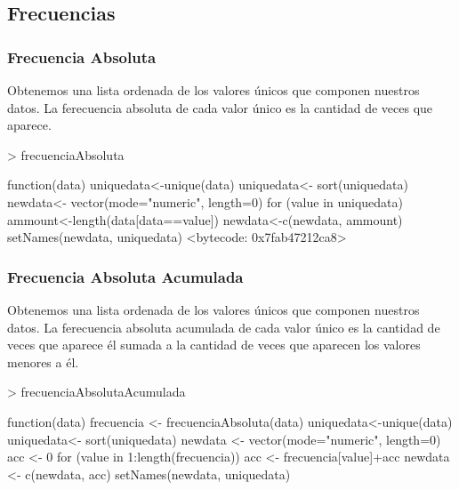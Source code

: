 \documentclass [a4paper] {article}
\begin{document}
\subsection{Frecuencias}
\subsubsection{Frecuencia Absoluta}
Obtenemos una lista ordenada de los valores únicos que componen nuestros datos.
La ferecuencia absoluta de cada valor único es la cantidad de veces que aparece.
\begin{Schunk}
\begin{Sinput}
> frecuenciaAbsoluta
\end{Sinput}
\begin{Soutput}
function(data){
  uniquedata<-unique(data)
  uniquedata<- sort(uniquedata)
  newdata<- vector(mode="numeric", length=0)
  for (value in uniquedata) {
    ammount<-length(data[data==value])
    newdata<-c(newdata, ammount)
  }
  setNames(newdata, uniquedata)
}
<bytecode: 0x7fab47212ca8>
\end{Soutput}
\end{Schunk}
\subsubsection{Frecuencia Absoluta Acumulada}
Obtenemos una lista ordenada de los valores únicos que componen nuestros datos.
La ferecuencia absoluta acumulada de cada valor único es la cantidad de veces que aparece él sumada a la cantidad de veces que aparecen los valores menores a él.
\begin{Schunk}
\begin{Sinput}
> frecuenciaAbsolutaAcumulada
\end{Sinput}
\begin{Soutput}
function(data){
    frecuencia <- frecuenciaAbsoluta(data)
    uniquedata<-unique(data)
    uniquedata<- sort(uniquedata)
    newdata <- vector(mode="numeric", length=0)
    acc <- 0
    for (value in 1:length(frecuencia)) {
        acc <- frecuencia[value]+acc
        newdata <- c(newdata, acc)
    }
    setNames(newdata, uniquedata)
}
\end{Soutput}
\end{Schunk}
\end{document}
